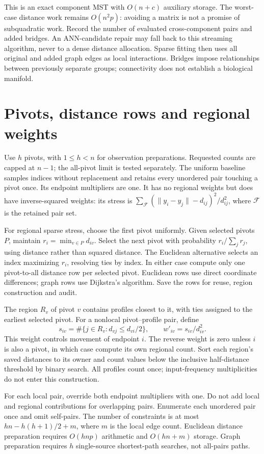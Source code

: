 \documentclass[11pt,letterpaper]{article}
\begin{document}
This is an exact component MST with $O(n+c)$ auxiliary storage. The worst-case
distance work remains $O(n^2p)$: avoiding a matrix is not a promise of subquadratic
work. Record the number of evaluated cross-component pairs and added bridges.
An ANN-candidate repair may fall back to this streaming algorithm, never to a
dense distance allocation. Sparse fitting then uses all original and added graph
edges as local interactions. Bridges impose relationships between previously
separate groups; connectivity does not establish a biological manifold.

\clearpage\section{Pivots, distance rows and regional weights}
Use $h$ pivots, with $1\leq h<n$ for observation preparations.
Requested counts are capped at $n-1$; the all-pivot limit is tested separately. The uniform baseline samples indices without
replacement and retains every unordered pair touching a pivot once. Its endpoint
multipliers are one. It has no regional weights but does have inverse-squared
weights: its stress is $\sum_{\mathcal F}(\|y_i-y_j\|-d_{ij})^2/d_{ij}^2$,
where $\mathcal F$ is the retained pair set.

For regional sparse stress, choose the first pivot uniformly. Given selected
pivots $P$, maintain $r_i=\min_{v\in P}d_{iv}$. Select the next pivot with
probability $r_i/\sum_j r_j$, using distance rather than squared distance.
The Euclidean alternative selects an index maximizing $r_i$, resolving ties by
index. In either case compute only one pivot-to-all distance row per selected
pivot. Euclidean rows use direct coordinate differences; graph rows use Dijkstra's
algorithm. Save the rows for reuse, region construction and audit.

The region $R_v$ of pivot $v$ contains profiles closest to it, with ties assigned
to the earliest selected pivot. For a nonlocal pivot--profile pair, define
\[
s_{iv}=\#\{j\in R_v:d_{vj}\leq d_{vi}/2\},\qquad w'_{iv}=s_{iv}/d_{iv}^2.
\]
This weight controls movement of endpoint $i$. The reverse weight is zero unless
$i$ is also a pivot, in which case compute its own regional count. Sort each
region's saved distances to its owner and count values below the inclusive
half-distance threshold by binary search. All profiles count once; input-frequency
multiplicities do not enter this construction.

For each local pair, override both endpoint multipliers with one. Do not add
local and regional contributions for overlapping pairs. Enumerate each unordered
pair once and omit self-pairs. The number of constraints is at most
$hn-h(h+1)/2+m$, where $m$ is the local edge count. Euclidean distance preparation
requires $O(hnp)$ arithmetic and $O(hn+m)$ storage. Graph preparation requires
$h$ single-source shortest-path searches, not all-pairs paths.
\end{document}

